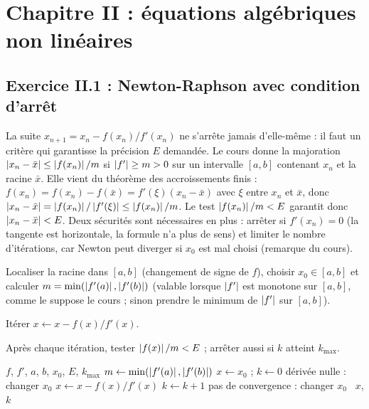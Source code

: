 \chapter{Chapitre II : équations algébriques non linéaires}

\section{Exercice II.1 : Newton-Raphson avec condition d'arrêt}


\Pourquoi La suite $x_{n+1} = x_n - f(x_n)/f'(x_n)$ ne s'arrête jamais
d'elle-même : il faut un critère qui garantisse la précision $E$ demandée. Le
cours donne la majoration $\left|x_n - \bar{x}\right| \le \left|f(x_n)\right|/m$ si
$\left|f'\right| \ge m > 0$ sur un intervalle $[a,b]$ contenant $x_n$ et la racine
$\bar{x}$. Elle vient du théorème des accroissements finis :
$f(x_n) = f(x_n) - f(\bar{x}) = f'(\xi)(x_n - \bar{x})$ avec $\xi$ entre $x_n$
et $\bar{x}$, donc $\left|x_n - \bar{x}\right| = \left|f(x_n)\right|/\left|f'(\xi)\right| \le
\left|f(x_n)\right|/m$. Le test $\left|f(x_n)\right|/m < E$ garantit donc
$\left|x_n - \bar{x}\right| < E$. Deux sécurités sont nécessaires en plus : arrêter si
$f'(x_n) = 0$ (la tangente est horizontale, la formule n'a plus de sens) et
limiter le nombre d'itérations, car Newton peut diverger si $x_0$ est mal choisi
(remarque du cours).

\Etapes
{} Localiser la racine dans $[a,b]$ (changement de signe de $f$),
choisir $x_0 \in [a,b]$ et calculer $m = \min(\left|f'(a)\right|, \left|f'(b)\right|)$
(valable lorsque $\left|f'\right|$ est monotone sur $[a,b]$, comme le suppose le
cours ; sinon prendre le minimum de $\left|f'\right|$ sur $[a,b]$).

 Itérer $x \leftarrow x - f(x)/f'(x)$.

 Après chaque itération, tester $\left|f(x)\right|/m < E$ ; arrêter aussi si
$k$ atteint $k_{\max}$.

\begin{algo}
  \Require $f$, $f'$, $a$, $b$, $x_0$, $E$, $k_{\max}$
  \State $m \leftarrow \min(\left|f'(a)\right|, \left|f'(b)\right|)$
  \State $x \leftarrow x_0$ ; $k \leftarrow 0$
  \Repeat
     \Print \og dérivée nulle : changer $x_0$ \fg{} \Stop \EndIf
    \State $x \leftarrow x - f(x)/f'(x)$
    \State $k \leftarrow k+1$
   \Print \og pas de convergence : changer $x_0$ \fg{}
  \Else \ \Print $x$, $k$
  \EndIf
\end{algo}

